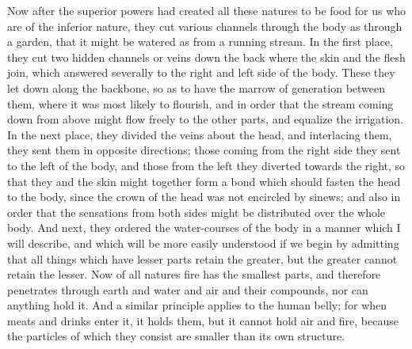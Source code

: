 \documentclass[11pt,letter]{article}
\begin{document}
\par  Now after the superior powers had created all these natures to be food for us who are of the inferior nature, they cut various channels through the body as through a garden, that it might be watered as from a running stream. In the first place, they cut two hidden channels or veins down the back where the skin and the flesh join, which answered severally to the right and left side of the body. These they let down along the backbone, so as to have the marrow of generation between them, where it was most likely to flourish, and in order that the stream coming down from above might flow freely to the other parts, and equalize the irrigation. In the next place, they divided the veins about the head, and interlacing them, they sent them in opposite directions; those coming from the right side they sent to the left of the body, and those from the left they diverted towards the right, so that they and the skin might together form a bond which should fasten the head to the body, since the crown of the head was not encircled by sinews; and also in order that the sensations from both sides might be distributed over the whole body. And next, they ordered the water-courses of the body in a manner which I will describe, and which will be more easily understood if we begin by admitting that all things which have lesser parts retain the greater, but the greater cannot retain the lesser. Now of all natures fire has the smallest parts, and therefore penetrates through earth and water and air and their compounds, nor can anything hold it. And a similar principle applies to the human belly; for when meats and drinks enter it, it holds them, but it cannot hold air and fire, because the particles of which they consist are smaller than its own structure.
\end{document}
